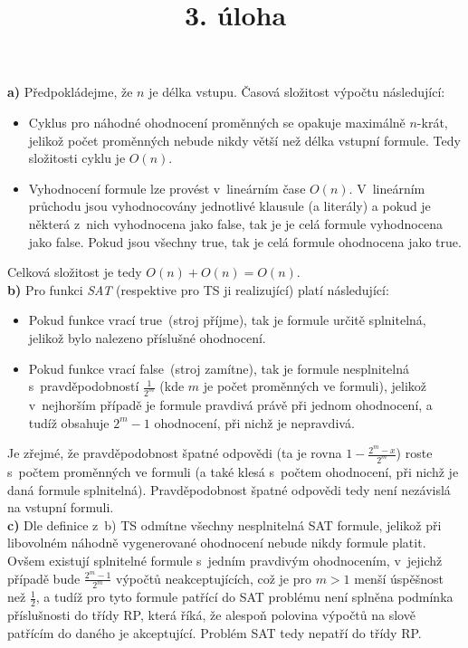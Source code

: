 \documentclass[a4paper]{article}
\title {3. úloha}
\newcommand{\fls}{false}
\newcommand{\tre}{true}
\begin{document}
\section*{}
\textbf{a)} Předpokládejme, že $n$ je délka vstupu.
Časová složitost výpočtu následující:
\begin{itemize}
    \item Cyklus pro náhodné ohodnocení proměnných se opakuje maximálně $n$-krát, jelikož počet proměnných nebude nikdy větší než
     délka vstupní formule.
    Tedy složitosti cyklu je $O(n)$.
    \item Vyhodnocení formule lze provést v~lineárním čase $O(n)$.
    V~lineárním průchodu jsou vyhodnocovány jednotlivé klausule (a literály) a pokud je některá z~nich vyhodnocena jako \fls, tak je
    je celá formule vyhodnocena jako \fls.
    Pokud jsou všechny \tre, tak je celá formule ohodnocena jako \tre.
\end{itemize}
Celková složitost je tedy $O(n)+O(n)=O(n)$.
\\

\noindent\textbf{b)} Pro funkci \emph{SAT} (respektive pro TS ji realizující) platí následující:
\begin{itemize}
    \item Pokud funkce vrací \tre\ (stroj příjme), tak je formule určitě splnitelná, jelikož bylo nalezeno příslušné ohodnocení.
    \item Pokud funkce vrací \fls\ (stroj zamítne), tak je formule nesplnitelná s~pravděpodobností $\frac{1}{2^m}$ (kde $m$ je počet proměnných
    ve formuli), jelikož v~nejhorším případě je formule pravdivá právě při jednom ohodnocení, a tudíž obsahuje $2^m-1$ ohodnocení,
    při nichž je nepravdivá.
\end{itemize}
Je zřejmé, že pravděpodobnost špatné odpovědi (ta je rovna $1-\frac{2^m-x}{2^m}$) roste s~počtem proměnných ve formuli
(a také klesá s~počtem ohodnocení, při nichž je daná formule splnitelná).
Pravděpodobnost špatné odpovědi tedy není nezávislá na vstupní formuli.
\\

\noindent\textbf{c)} Dle definice z~b) TS odmítne všechny nesplnitelná SAT formule, jelikož při libovolném náhodně vygenerované ohodnocení nebude
nikdy formule platit.
Ovšem existují splnitelné formule s~jedním pravdivým ohodnocením, v~jejichž případě bude $\frac{2^m-1}{2^m}$ výpočtů neakceptujících,
což je pro $m>1$ menší úspěšnost než $\frac{1}{2}$, a tudíž pro tyto formule patřící do SAT problému není splněna podmínka příslušnosti do třídy RP,
která říká, že alespoň polovina výpočtů na slově patřícím do daného je akceptující.
Problém SAT tedy nepatří do třídy RP.
\end{document}
